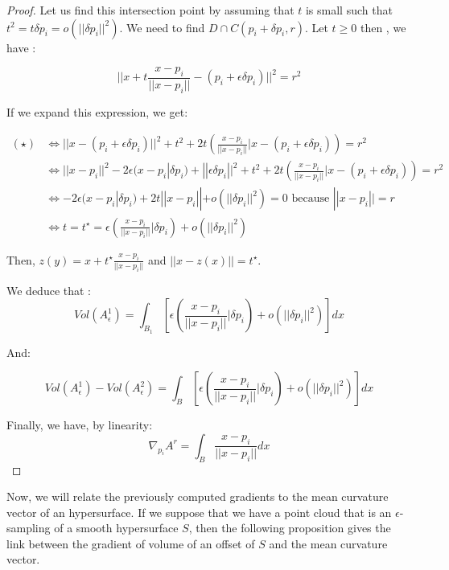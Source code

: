 \begin{proof}
Let us find this intersection point by assuming that $ t $ is small such that $
t^2 = t \delta p_i = o(||\delta p_i||^2) $. We need to find $ D \cap C(p_i +
\delta p_i, r) $. Let $ t \ge 0 $ then , we have :

\begin{equation}
    || x + t \frac{x - p_i}{||x - p_i||} - (p_i + \epsilon \delta p_i) ||^2 = r^2
    \tag{$\star$}
\end{equation}

If we expand this expression, we get:

\begin{align*}
    (\star) & \iff || x - (p_i + \epsilon \delta p_i) ||^2 + t^2 + 2t \left(
        \frac{x-p_i}{|| x - p_i||} | x - (p_i + \epsilon \delta p_i) \right) = r^2 \\
    & \iff || x - p_i || ^2 - 2 \epsilon (x - p_i | \delta p_i) + || \epsilon \delta p_i || ^2 + t^2 + 2t
    \left( \frac{x-p_i}{|| x - p_i||} | x - (p_i + \epsilon \delta p_i) \right) = r^2 \\
    & \iff -2 \epsilon (x - p_i | \delta p_i) + 2t || x - p_i|| + o(||\delta p_i||^2) = 0
    \text{ because } || x - p_i || = r \\
    & \iff t = t^{\star} = \epsilon \left( \frac{x - p_i}{||x - p_i||} | \delta p_i \right) +
    o(||\delta p_i||^2)
\end{align*}

Then, $ z(y) = x + t^{\star} \frac{x - p_i}{||x - p_i||} $ and $ || x - z(x) || =
t^{\star} $.

We deduce that :
$$ Vol(A^1_\epsilon) = \int_{B_1} \left[ \epsilon \left( \frac{x - p_i}{||x -
            p_i||} | \delta p_i \right) + o(||\delta p_i||^2) \right] dx $$

And:

$$ Vol(A^1_\epsilon) - Vol(A^2_\epsilon) = \int_{B} \left[ \epsilon \left(
        \frac{x - p_i}{||x - p_i||} | \delta p_i \right) + o(||\delta p_i||^2)
\right] dx $$

Finally, we have, by linearity:
$$ \nabla_{p_i} A^r = \int_{B} \frac{x - p_i}{||x - p_i||} dx $$

\end{proof}

Now, we will relate the previously computed gradients to the mean curvature
vector of an hypersurface. If we suppose that we have a point cloud that is an
$\epsilon$-sampling of a smooth hypersurface $ S $, then the following
proposition gives the link between the gradient of volume of an offset of $ S $
and the mean curvature vector.

